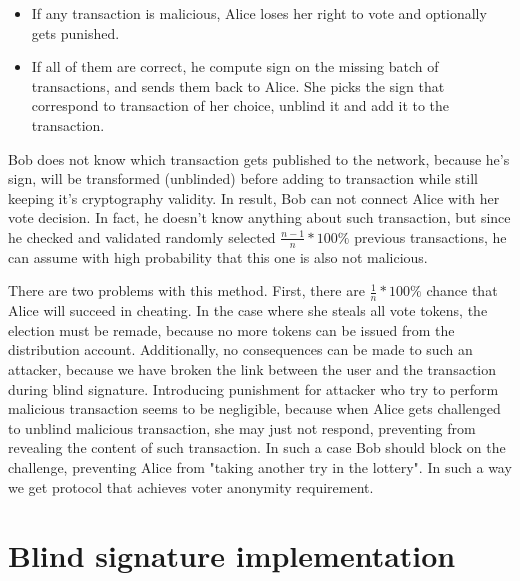 \documentclass[runningheads]{llncs}
\begin{document}
\begin{itemize}
 \item If any transaction is malicious, Alice loses her right to vote and optionally gets punished.

 \item If all of them are correct, he compute sign on the missing batch of transactions, and sends them back to Alice. She picks the sign that correspond to transaction of her choice, unblind it and add it to the transaction.
\end{itemize}

Bob does not know which transaction gets published to the network, because he's sign, will be transformed (unblinded) before adding to transaction while still keeping it's cryptography validity. In result, Bob can not connect Alice with her vote decision. In fact, he doesn't know anything about such transaction, but since he checked and validated randomly selected \(\frac{n-1}{n}*100\%\) previous transactions, he can assume with high probability that this one is also not malicious.

There are two problems with this method.
First, there are \(\frac{1}{n}*100\%\) chance that Alice will succeed in cheating. In the case where she steals all vote tokens, the election must be remade, because no more tokens can be issued from the distribution account. Additionally, no consequences can be made to such an attacker, because we have broken the link between the user and the transaction during blind signature. Introducing punishment for attacker who try to perform malicious transaction seems to be negligible, because when Alice gets challenged to unblind malicious transaction, she may just not respond, preventing from revealing the content of such transaction. In such a case Bob should block on the challenge, preventing Alice from "taking another try in the lottery".
In such a way  we get protocol that achieves voter anonymity requirement.




\section{Blind signature implementation}
\end{document}
